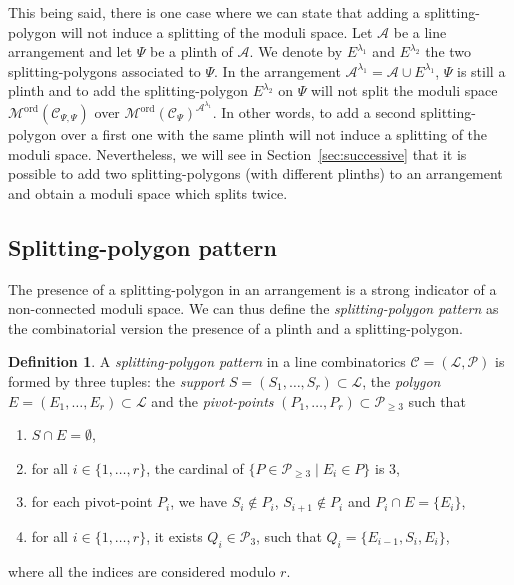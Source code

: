 \documentclass[11pt, a4paper]{amsart}
\theoremstyle{definition}
\newtheorem{definition}[theorem]{Definition}
\theoremstyle{remark}
\newcommand{\A}{\mathcal{A}}
\newcommand{\C}{\mathcal{C}}
\newcommand{\M}{\mathcal{M}}
\renewcommand{\P}{\mathcal{P}}
\renewcommand{\L}{\mathcal{L}}
\newcommand{\ord}{\text{ord}}
\begin{document}
This being said, there is one case where we can state that adding a splitting-polygon will not induce a splitting of the moduli space. Let $\A$ be a line arrangement and let $\Psi$ be a plinth of $\A$. We denote by $E^{\lambda_1}$ and $E^{\lambda_2}$ the two splitting-polygons associated to $\Psi$. In the arrangement $\A^{\lambda_1}=\A\cup E^{\lambda_1}$, $\Psi$ is still a plinth and to add the splitting-polygon $E^{\lambda_2}$ on $\Psi$ will not split the moduli space $\M^\ord(\C_{\Psi,\Psi})$ over $\M^\ord(\C_\Psi)^{\A^{\lambda_1}}$. In other words, to add a second splitting-polygon over a first one with the same plinth will not induce a splitting of the moduli space. Nevertheless, we will see in Section~\ref{sec:successive} that it is possible to add two splitting-polygons (with different plinths) to an arrangement and obtain a moduli space which splits twice.



\subsection{Splitting-polygon pattern}\mbox{}

The presence of a splitting-polygon in an arrangement is a strong indicator of a non-connected moduli space. We can thus define the \emph{splitting-polygon pattern} as the combinatorial version the presence of a plinth and a splitting-polygon.

\begin{definition}\label{def:SPP}
	A \emph{splitting-polygon pattern} in a line combinatorics $\C=(\L,\P)$ is formed by three tuples: the \emph{support} $S=(S_1, \dots , S_r) \subset \L$,  the \emph{polygon} $E=(E_1, \dots , E_r) \subset \L$ and the \emph{pivot-points} $(P_1, \dots, P_r) \subset \P_{\geq 3}$ such that
	\begin{enumerate}
		\item $S \cap E = \emptyset$,
		\item for all $ i \in \{1,\dots,r\} $, the cardinal of  $ \{P \in \P_{\geq 3} \mid E_i \in P\} $ is $3$,
		\item for each pivot-point $P_i$, we have $S_i\notin P_i$, $S_{i+1}\notin P_i$ and $P_i \cap E = \{E_i\}$,
		\item for all $ i \in \{1,\dots,r\} $, it exists $Q_i \in \P_3$, such that $Q_i=\{E_{i-1},S_i,E_i\}$, 
	\end{enumerate}
	where all the indices are considered modulo $r$.
\end{definition}
\end{document}
